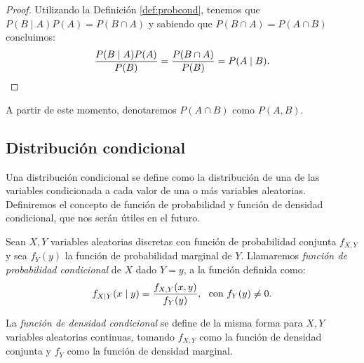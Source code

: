 \documentclass[oneside,openright,titlepage,numbers=noenddot,openany,headinclude,footinclude=true,
cleardoublepage=empty,abstractoff,BCOR=5mm,paper=a4,fontsize=12pt,main=spanish]{scrreprt}
\begin{document}
\begin{proof}
 Utilizando la Definición \ref{def:probcond}, tenemos que $P(B \mid A) P(A)=P(B\cap A)$ y sabiendo que $P(B \cap A)=P(A \cap B)$ concluimos: $$\frac{\displaystyle P(B \mid A) P(A)}{\displaystyle P(B)}=\frac{\displaystyle P(B \cap A)}{\displaystyle P(B)}=P(A \mid B).$$
\end{proof}

\begin{notation}
A partir de este momento, denotaremos $P(A\cap B)$ como $P(A,B)$.
\end{notation}

\subsection{Distribución condicional}

Una distribución condicional se define como la distribución de una de las variables condicionada a cada valor de una o más variables aleatorias. Definiremos el concepto de función de probabilidad y función de densidad condicional, que nos serán útiles en el futuro.\\

\begin{definition} \label{def:funcprobcond}
Sean $X,Y$ variables aleatorias discretas con función de probabilidad conjunta $f_{X,Y}$ y sea $f_{Y}(y)$ la función de probabilidad marginal de $Y$. Llamaremos \textit{función de probabilidad condicional} de $X$ dado $Y=y$, a la función definida como: $$f_{X\mid Y}(x \mid y)=\frac{\displaystyle f_{X,Y}(x,y)}{\displaystyle f_Y(y)}, \ \ \text{con} \ f_{Y}(y) \neq 0.$$

\begin{remark}
La \textit{función de densidad condicional} se define de la misma forma para $X,Y$ variables aleatorias continuas, tomando $f_{X,Y}$ como la función de densidad conjunta y $f_{Y}$ como la función de densidad marginal.
\end{remark}
\end{definition}\

\end{document}
